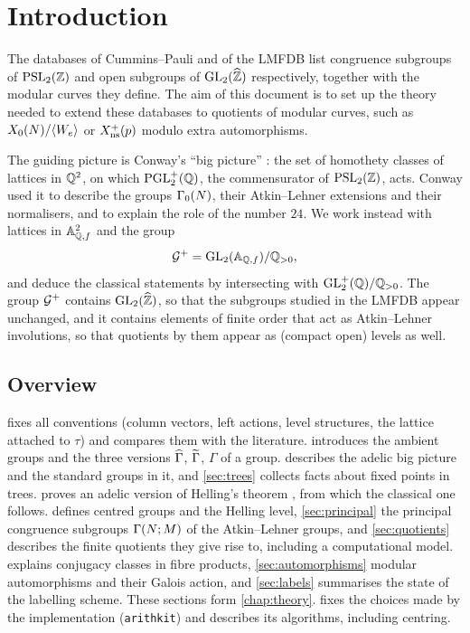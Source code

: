 \section{Introduction}

The databases of Cummins--Pauli \cite{CumminsPauli2003} and of the LMFDB
\cite{LMFDB,RSZB2022} list congruence subgroups of $\PSL{2}{\ZZ}$ and open
subgroups of $\GL{2}{\ProfiniteIntegers}$ respectively, together with the
modular curves they define. The aim of this document is to set up the theory
needed to extend these databases to quotients of modular curves, such as
$X_{0}(N)/\langle W_{e}\rangle$ or $X_{\mathrm{ns}}^{+}(p)$
modulo extra automorphisms.

The guiding picture is Conway's ``big picture'' \cite{Conway1996}: the set
of homothety classes of lattices in $\mathbb{Q}^{2}$, on which
$\mathrm{PGL}_{2}^{+}(\mathbb{Q})$, the commensurator of $\PSL{2}{\ZZ}$, acts. Conway
used it to describe the groups $\GammaZero{N}$, their Atkin--Lehner
extensions and their normalisers, and to explain the role of the number
$24$. We work instead with lattices in $\mathbb{A}_{\mathbb{Q},f}^{2}$ and the group
\[
  \AdelicGroup = \GL{2}{\FiniteAdeles{\QQ}}/\PositiveRationals ,
\]
and deduce the classical statements by intersecting with
$\mathrm{GL}_{2}^{+}(\mathbb{Q})/\mathbb{Q}_{>0}$. The group $\mathcal{G}^{+}$ contains
$\GL{2}{\ProfiniteIntegers}$, so that the subgroups studied in the LMFDB
appear unchanged, and it contains elements of finite order that act as
Atkin--Lehner involutions, so that quotients by them appear as
(compact open) levels as well.

\subsection*{Overview}
 fixes all conventions (column vectors, left actions,
level structures, the lattice attached to $\tau$) and compares them with
the literature.  introduces the ambient groups and the
three versions $\widehat{\Gamma}$, $\widetilde{\Gamma}$, $\Gamma$ of a group.
 describes the adelic big picture and the standard
groups in it, and \cref{sec:trees} collects facts about fixed points in
trees.  proves an adelic version of Helling's theorem
\cite{Helling1970}, from which the classical one follows.
 defines centred groups and the Helling level,
\cref{sec:principal} the principal congruence subgroups
$\GammaPrincipal{N}{M}$ of the Atkin--Lehner groups, and
\cref{sec:quotients} describes the finite quotients they give rise to,
including a computational model.  explains conjugacy
classes in fibre products, \cref{sec:automorphisms} modular automorphisms
and their Galois action, and \cref{sec:labels} summarises the state of the
labelling scheme. These sections form \cref{chap:theory}.
 fixes the choices made by the implementation
(\texttt{arithkit}) and describes its algorithms, including centring.


